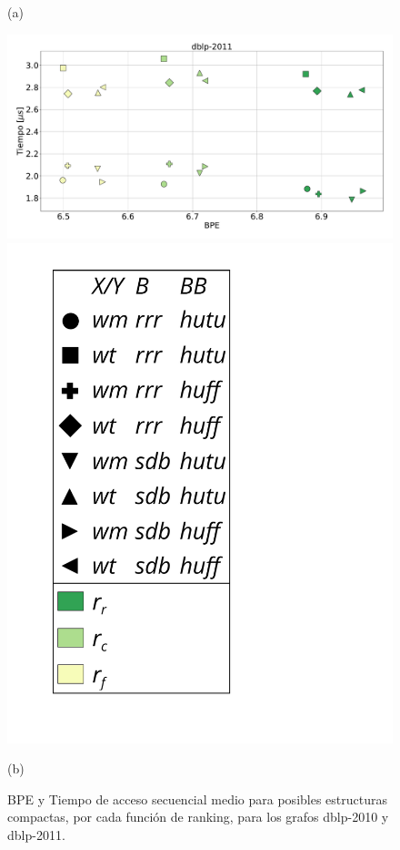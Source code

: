 \begin{figure}
\begin{minipage}{1\textwidth}
    			(a)		
    	\end{minipage}
    	
       	\begin{minipage}{1\textwidth}
    			\centering
    			\begin{minipage}{0.8\textwidth}
    				\centering
    				\includegraphics[width=1\linewidth]{img/sdsl/secuencialBig/dblp-2011.pdf}
    			\end{minipage}
    			\begin{minipage}{0.15\textwidth}
    				\centering
    				\includegraphics[scale=.235, clip, trim=70 0 0 0]{img/sdsl/label.pdf}
    			\end{minipage}
    			
    			(b)		
    	\end{minipage}
    	
    \caption{BPE y Tiempo de acceso secuencial medio para posibles estructuras compactas, por cada función de ranking, para los grafos dblp-2010 y dblp-2011.}
    \label{fig:sdslBPE3}
\end{figure}
